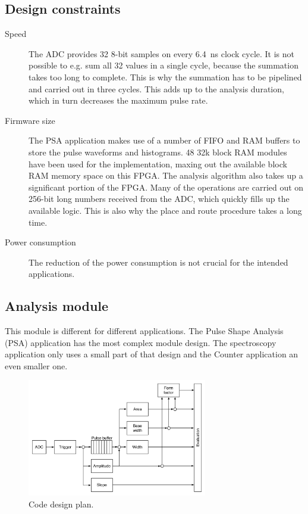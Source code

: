 \subsection{Design constraints}
\begin{description}
\item[Speed] The ADC provides 32 8-bit samples on every 6.4~ns clock cycle. It is not possible to e.g. sum all 32 values in a single cycle, because the summation takes too long to complete. This is why the summation has to be pipelined and carried out in three cycles. This adds up to the analysis duration, which in turn decreases the maximum pulse rate.
\item[Firmware size] The PSA application makes use of a number of FIFO and RAM buffers to store the pulse waveforms and histograms. 48 32k block RAM modules have been used for the implementation, maxing out the available block RAM memory space on this FPGA. The analysis algorithm also takes up a significant portion of the FPGA. Many of the operations are carried out on 256-bit long numbers received from the ADC, which quickly fills up the available logic. This is also why the place and route procedure takes a long time.
\item[Power consumption] The reduction of the power consumption is not crucial for the intended applications.
\end{description}


\subsection{Analysis module}
\label{subsec:algorithm}
This module is different for different applications. The Pulse Shape Analysis (PSA) application has the most complex module design. The spectroscopy application only uses a small part of that design and the Counter application an even smaller one.


\begin{figure}[!t]
\centering
\includegraphics[width=0.7\textwidth]{05_current_monitoring/plots/analysis1}
\caption{Code design plan.}
\label{fig:architecture}
\end{figure}

